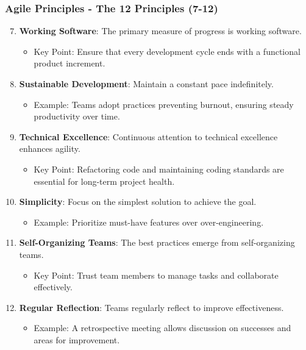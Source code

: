 \documentclass{beamer}
\begin{document}
\begin{frame}[fragile]
    \frametitle{Agile Principles - The 12 Principles (7-12)}
    \begin{enumerate}
        \setcounter{enumi}{6} %
        \item \textbf{Working Software}: The primary measure of progress is working software.
            \begin{itemize}
                \item Key Point: Ensure that every development cycle ends with a functional product increment.
            \end{itemize}
        \item \textbf{Sustainable Development}: Maintain a constant pace indefinitely.
            \begin{itemize}
                \item Example: Teams adopt practices preventing burnout, ensuring steady productivity over time.
            \end{itemize}
        \item \textbf{Technical Excellence}: Continuous attention to technical excellence enhances agility.
            \begin{itemize}
                \item Key Point: Refactoring code and maintaining coding standards are essential for long-term project health.
            \end{itemize}
        \item \textbf{Simplicity}: Focus on the simplest solution to achieve the goal.
            \begin{itemize}
                \item Example: Prioritize must-have features over over-engineering.
            \end{itemize}
        \item \textbf{Self-Organizing Teams}: The best practices emerge from self-organizing teams.
            \begin{itemize}
                \item Key Point: Trust team members to manage tasks and collaborate effectively.
            \end{itemize}
        \item \textbf{Regular Reflection}: Teams regularly reflect to improve effectiveness.
            \begin{itemize}
                \item Example: A retrospective meeting allows discussion on successes and areas for improvement.
            \end{itemize}
    \end{enumerate}
\end{frame}
\end{document}

